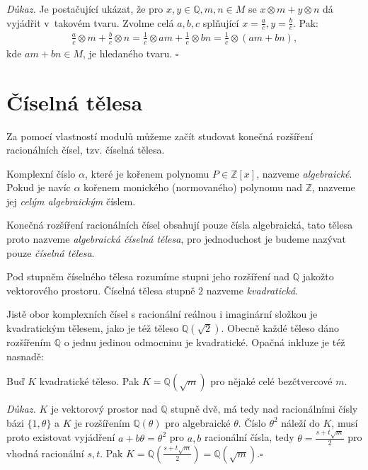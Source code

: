 \documentclass[12pt]{report}
\begin{document}
\textit{Důkaz.} Je postačující ukázat, že pro $x,y \in \mathbb{Q}, m,n \in M$ se $x \otimes m + y \otimes n$ dá vyjádřit v~takovém tvaru. Zvolme celá $a,b,c$ splňující $x = \frac{a}{c}, y = \frac{b}{c}$. Pak:
\begin{align*}
\frac{a}{c} \otimes m + \frac{b}{c} \otimes n = \frac{1}{c} \otimes am + \frac{1}{c} \otimes bn = \frac{1}{c} \otimes (am+bn),
\end{align*}
kde $am+bn \in M$, je hledaného tvaru. \hfill $\square$



\section{Číselná tělesa}

Za pomocí vlastností modulů můžeme začít studovat konečná rozšíření racionálních čísel, tzv. číselná tělesa.

\begin{definice}
Komplexní číslo $\alpha$, které je kořenem polynomu $P \in \mathbb{Z}[x]$, nazveme \textit{algebraické}. Pokud je navíc $\alpha$ kořenem monického (normovaného) polynomu nad $\mathbb{Z}$, nazveme jej \textit{celým algebraickým} číslem.
\end{definice}

\begin{definice}
Konečná rozšíření racionálních čísel obsahují pouze čísla algebraická, tato tělesa proto nazveme \textit{algebraická číselná tělesa}, pro jednoduchost je budeme nazývat pouze \textit{číselná tělesa}.
\end{definice}


\begin{definice}
Pod stupněm číselného tělesa rozumíme stupni jeho rozšíření nad $\mathbb{Q}$ jakožto vektorového prostoru. Číselná tělesa stupně $2$ nazveme \textit{kvadratická}.
\end{definice}

Jistě obor komplexních čísel s racionální reálnou i imaginární složkou je kvadratickým tělesem, jako je též těleso $\mathbb{Q}(\sqrt{2})$. Obecně každé těleso dáno rozšířením $\mathbb{Q}$ o jednu jedinou odmocninu je kvadratické. Opačná inkluze je též nasnadě:

\begin{veta}
Buď $K$ kvadratické těleso. Pak $K = \mathbb{Q}(\sqrt{m})$ pro nějaké celé bezčtvercové $m$.
\end{veta}
\noindent \textit{Důkaz.} $K$ je vektorový prostor nad $\mathbb{Q}$ stupně dvě, má tedy nad racionálními čísly bázi $\lbrace 1, \theta \rbrace$ a $K$ je rozšířením $\mathbb{Q}(\theta)$ pro algebraické $\theta$. Číslo $\theta ^2$ náleží do $K$, musí proto existovat vyjádření $a+b\theta = \theta ^2$ pro $a,b$ racionální čísla, tedy $\theta = \frac{s+t\sqrt{m}}{2}$ pro vhodná racionální $s,t$. Pak $K = \mathbb{Q}\left(\frac{s+t\sqrt{m}}{2} \right) = \mathbb{Q}(\sqrt{m})$.\hfill $\square$\\
\end{document}
